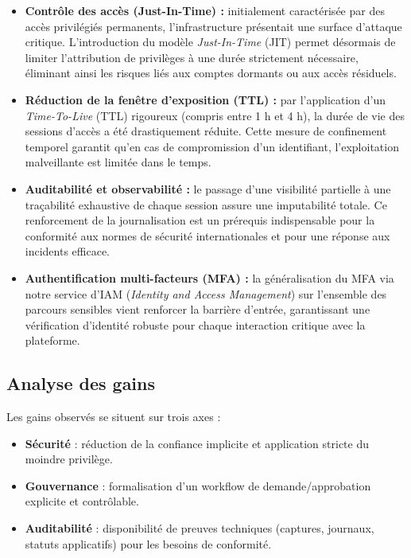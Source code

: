 \begin{itemize}
    \item \textbf{Contrôle des accès (Just-In-Time) :} initialement caractérisée par des accès privilégiés permanents, l'infrastructure présentait une surface d'attaque critique. L'introduction du modèle \textit{Just-In-Time} (JIT) permet désormais de limiter l'attribution de privilèges à une durée strictement nécessaire, éliminant ainsi les risques liés aux comptes dormants ou aux accès résiduels.
    
    \item \textbf{Réduction de la fenêtre d'exposition (TTL) :} par l'application d'un \textit{Time-To-Live} (TTL) rigoureux (compris entre 1 h et 4 h), la durée de vie des sessions d'accès a été drastiquement réduite. Cette mesure de confinement temporel garantit qu'en cas de compromission d'un identifiant, l'exploitation malveillante est limitée dans le temps.
    
    \item \textbf{Auditabilité et observabilité :} le passage d'une visibilité partielle à une traçabilité exhaustive de chaque session assure une imputabilité totale. Ce renforcement de la journalisation est un prérequis indispensable pour la conformité aux normes de sécurité internationales et pour une réponse aux incidents efficace.
    
    \item \textbf{Authentification multi-facteurs (MFA) :} la généralisation du MFA via notre service d'IAM (\textit{Identity and Access Management}) sur l'ensemble des parcours sensibles vient renforcer la barrière d'entrée, garantissant une vérification d'identité robuste pour chaque interaction critique avec la plateforme.
\end{itemize}




\subsection{Analyse des gains}
Les gains observés se situent sur trois axes :
\begin{itemize}
	\item \textbf{Sécurité} : réduction de la confiance implicite et application stricte du moindre privilège.
	\item \textbf{Gouvernance} : formalisation d'un workflow de demande/approbation explicite et contrôlable.
	\item \textbf{Auditabilité} : disponibilité de preuves techniques (captures, journaux, statuts applicatifs) pour les besoins de conformité.
\end{itemize}

